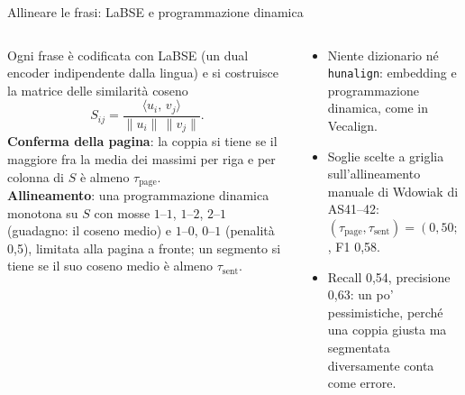 \documentclass[aspectratio=169]{beamer}
\newcommand{\T}[2]{#2}
\newcommand{\T}[2]{#1}
\begin{document}
\begin{frame}{\T{Sentence alignment with LaBSE and a monotonic DP}%
                {Allineare le frasi: LaBSE e programmazione dinamica}}
  \begin{columns}[t]
    \begin{column}{0.56\textwidth}
      \footnotesize
      \T{Embed every sentence with LaBSE (a language-agnostic dual encoder) and build the
      cosine-similarity matrix}%
      {Ogni frase \`e codificata con LaBSE (un dual encoder indipendente dalla lingua) e si
      costruisce la matrice delle similarit\`a coseno}
      \[
        S_{ij}=\frac{\langle u_i,\,v_j\rangle}{\lVert u_i\rVert\,\lVert v_j\rVert}.
      \]
      \textbf{\T{Page confirmation}{Conferma della pagina}}: \T{keep the pair if the larger of
      the mean row and column maxima of $S$ is at least $\tau_{\text{page}}$.}%
      {la coppia si tiene se il maggiore fra la media dei massimi per riga e per colonna di $S$ \`e
      almeno $\tau_{\text{page}}$.}\\
      \textbf{\T{Alignment}{Allineamento}}: \T{a monotonic DP over $S$ with moves}%
      {una programmazione dinamica monotona su $S$ con mosse} $1$--$1$, $1$--$2$, $2$--$1$ \T{(gain: the mean cosine)
      and}{(guadagno: il coseno medio) e} $1$--$0$, $0$--$1$ \T{(penalty 0.5), banded to the
      facing page; a span is kept if its mean cosine is at least $\tau_{\text{sent}}$.}%
      {(penalit\`a 0,5), limitata alla pagina a fronte; un segmento si tiene se il suo coseno medio \`e almeno $\tau_{\text{sent}}$.}
    \end{column}
    \begin{column}{0.44\textwidth}
      \footnotesize
      \begin{itemize}
        \item \T{No dictionary and no \texttt{hunalign}: embeddings and a DP, in the spirit of
              Vecalign.}%
              {Niente dizionario n\'e \texttt{hunalign}: embedding e programmazione dinamica, come in Vecalign.}
        \item \T{Thresholds chosen on a grid against Wdowiak's hand alignment of AS41--42:
              $(\tau_{\text{page}},\tau_{\text{sent}})=(0.50,0.40)$, F1 0.58.}%
              {Soglie scelte a griglia sull'allineamento manuale di Wdowiak di AS41--42: $(\tau_{\text{page}},\tau_{\text{sent}})=(0{,}50;\,0{,}40)$, F1 0,58.}
        \item \T{Recall 0.54, precision 0.63: somewhat pessimistic, since a correct pair
              segmented differently counts as an error.}%
              {Recall 0,54, precisione 0,63: un po' pessimistiche, perch\'e una coppia giusta
              ma segmentata diversamente conta come errore.}
      \end{itemize}
    \end{column}
  \end{columns}
\end{frame}
\end{document}
